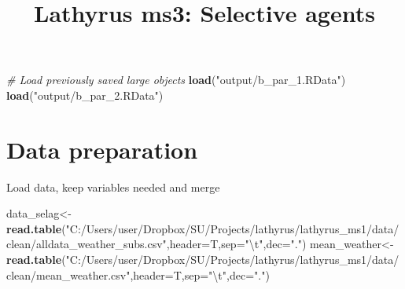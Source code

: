 \documentclass[
]{article}
\title{Lathyrus ms3: Selective agents}
\author{}
\date{\vspace{-2.5em}}
\newenvironment{Shaded}{\begin{snugshade}}{\end{snugshade}}
\newcommand{\CharTok}[1]{\textcolor[rgb]{0.31,0.60,0.02}{#1}}
\newcommand{\CommentTok}[1]{\textcolor[rgb]{0.56,0.35,0.01}{\textit{#1}}}
\newcommand{\DataTypeTok}[1]{\textcolor[rgb]{0.13,0.29,0.53}{#1}}
\newcommand{\KeywordTok}[1]{\textcolor[rgb]{0.13,0.29,0.53}{\textbf{#1}}}
\newcommand{\NormalTok}[1]{#1}
\newcommand{\StringTok}[1]{\textcolor[rgb]{0.31,0.60,0.02}{#1}}
\begin{document}
\maketitle

{
\setcounter{tocdepth}{4}
\tableofcontents
}
\begin{Shaded}
\begin{Highlighting}[]
\CommentTok{\# Load previously saved large objects}
\KeywordTok{load}\NormalTok{(}\StringTok{"output/b\_par\_1.RData"}\NormalTok{)}
\KeywordTok{load}\NormalTok{(}\StringTok{"output/b\_par\_2.RData"}\NormalTok{)}
\end{Highlighting}
\end{Shaded}

\hypertarget{data-preparation}{%
\section{Data preparation}\label{data-preparation}}

Load data, keep variables needed and merge

\begin{Shaded}
\begin{Highlighting}[]
\NormalTok{data\_selag\textless{}{-}}\KeywordTok{read.table}\NormalTok{(}\StringTok{"C:/Users/user/Dropbox/SU/Projects/lathyrus/lathyrus\_ms1/data/clean/alldata\_weather\_subs.csv"}\NormalTok{,}\DataTypeTok{header=}\NormalTok{T,}\DataTypeTok{sep=}\StringTok{"}\CharTok{\textbackslash{}t}\StringTok{"}\NormalTok{,}\DataTypeTok{dec=}\StringTok{"."}\NormalTok{) }
\NormalTok{mean\_weather\textless{}{-}}\KeywordTok{read.table}\NormalTok{(}\StringTok{"C:/Users/user/Dropbox/SU/Projects/lathyrus/lathyrus\_ms1/data/clean/mean\_weather.csv"}\NormalTok{,}\DataTypeTok{header=}\NormalTok{T,}\DataTypeTok{sep=}\StringTok{"}\CharTok{\textbackslash{}t}\StringTok{"}\NormalTok{,}\DataTypeTok{dec=}\StringTok{"."}\NormalTok{)}
\end{Highlighting}
\end{Shaded}
\end{document}
